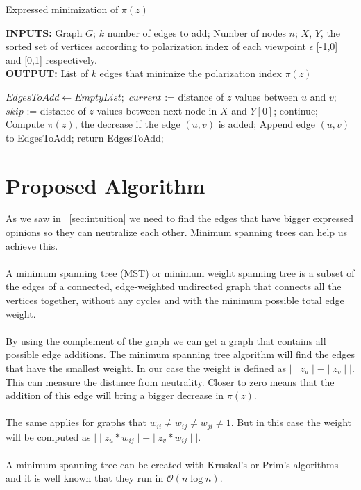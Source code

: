 \begin{algorithm}[htbp]
	\caption{Expressed minimization of $\pi(z)$}
	\label{alg:ExpressedAlgo}
	\begin{flushleft}
        		\textbf{INPUTS:} Graph $G$; $k$ number of edges to add; Number of nodes $n$;
		$X$, $Y $, the sorted set of vertices according to polarization index of each viewpoint $\epsilon$ [-1,0] and [0,1] respectively.\\
		\vspace{6pt}
        		\textbf{OUTPUT:} List of $k$ edges that minimize the polarization index $\pi(z)$
	\end{flushleft}
	\begin{algorithmic}[1]
		\STATE $EdgesToAdd \leftarrow Empty List;$
			\STATE $current$ := distance of $z$ values between $u$ and $v$;
			\STATE $skip$ := distance of $z$ values between next node in $X$ and $Y[0]$;
				\STATE continue;
			\ENDIF
		\STATE Compute $\pi(z)$, the decrease if the edge $(u,v)$ is added;
		\STATE Append edge $(u,v)$ to EdgesToAdd;
			\STATE return EdgesToAdd;
		\ENDIF
		\ENDFOR
		\ENDFOR
	\end{algorithmic}
\end{algorithm}

\clearpage

\section{Proposed Algorithm}
\label{sec:proposed}

As we saw in ~\ref{sec:intuition} we need to find the edges that have bigger expressed opinions so they can neutralize each other. Minimum spanning trees can help us achieve this.
\\
\\
A minimum spanning tree (MST) or minimum weight spanning tree is a subset of the edges of a connected, edge-weighted undirected graph that connects all the vertices together, without any cycles and with the minimum possible total edge weight.
\\
\\
By using the complement of the graph we can get a graph that contains all possible edge additions. The minimum spanning tree algorithm will find the edges that have the smallest weight. In our case the weight is defined as $\mid \mid{z_u}\mid - \mid{z_v}\mid\mid$. This can measure the distance from neutrality. Closer to zero means that the addition of this edge will bring a bigger decrease in $\pi(z)$. 
\\
\\
The same applies for graphs that $w_{ii} \neq w_{ij} \neq w_{ji} \neq 1$. But in this case the weight will be computed as $\mid \mid{z_u*w_{ij}}\mid - \mid{z_v*w_{ij}}\mid\mid$.
\\
\\
A minimum spanning tree can be created with Kruskal's or Prim's algorithms and it is well known that they run in $\mathcal{O}(n\log{}n)$.

